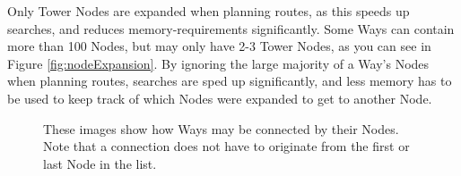 Only Tower Nodes are expanded when planning routes, as this speeds up searches, and reduces memory-requirements significantly. Some Ways can contain more than 100 Nodes, but may only have 2-3 Tower Nodes, as you can see in Figure \ref{fig:nodeExpansion}. By ignoring the large majority of a Way's Nodes when planning routes, searches are sped up significantly, and less memory has to be used to keep track of which Nodes were expanded to get to another Node.

\begin{figure}
	\centering
	
	\caption[Connections between Ways]{These images show how Ways may be connected by their Nodes. Note that a connection does not have to originate from the first or last Node in the list.}
	\label{fig:connectionsWays}
\end{figure}


